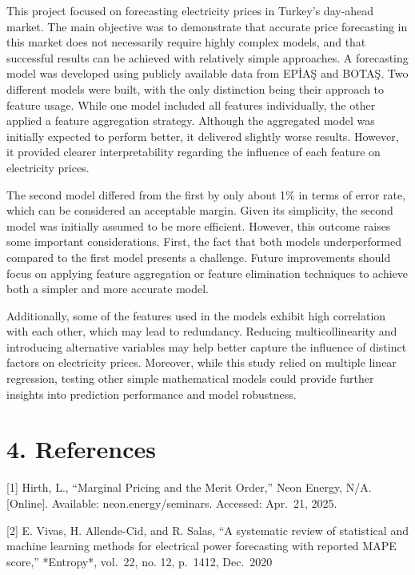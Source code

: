 \documentclass[
  11pt,
  a4paper,
]{article}
\begin{document}
This project focused on forecasting electricity prices in Turkey's
day-ahead market. The main objective was to demonstrate that accurate
price forecasting in this market does not necessarily require highly
complex models, and that successful results can be achieved with
relatively simple approaches. A forecasting model was developed using
publicly available data from EPİAŞ and BOTAŞ. Two different models were
built, with the only distinction being their approach to feature usage.
While one model included all features individually, the other applied a
feature aggregation strategy. Although the aggregated model was
initially expected to perform better, it delivered slightly worse
results. However, it provided clearer interpretability regarding the
influence of each feature on electricity prices.

The second model differed from the first by only about 1\% in terms of
error rate, which can be considered an acceptable margin. Given its
simplicity, the second model was initially assumed to be more efficient.
However, this outcome raises some important considerations. First, the
fact that both models underperformed compared to the first model
presents a challenge. Future improvements should focus on applying
feature aggregation or feature elimination techniques to achieve both a
simpler and more accurate model.

Additionally, some of the features used in the models exhibit high
correlation with each other, which may lead to redundancy. Reducing
multicollinearity and introducing alternative variables may help better
capture the influence of distinct factors on electricity prices.
Moreover, while this study relied on multiple linear regression, testing
other simple mathematical models could provide further insights into
prediction performance and model robustness.

\section{4. References}\label{references}

{[}1{]} Hirth, L., ``Marginal Pricing and the Merit Order,'' Neon
Energy, N/A. {[}Online{]}. Available: neon.energy/seminars. Accessed:
Apr.~21, 2025.

{[}2{]} E. Vivas, H. Allende-Cid, and R. Salas, ``A systematic review of
statistical and machine learning methods for electrical power
forecasting with reported MAPE score,'' *Entropy*, vol.~22, no. 12,
p.~1412, Dec.~2020
\end{document}
